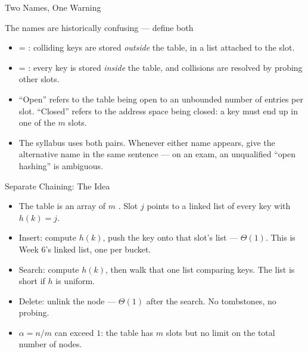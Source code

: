 \documentclass[aspectratio=169]{beamer}
\begin{document}
\begin{frame}{Two Names, One Warning}
  \begin{alertblock}{The names are historically confusing --- define both}
    \begin{itemize}
      \item {} = : colliding keys are
        stored \emph{outside} the table, in a list attached to the slot.
      \item {} = : every key is stored
        \emph{inside} the table, and collisions are resolved by probing other
        slots.
    \end{itemize}
  \end{alertblock}
  \begin{itemize}
    \item ``Open'' refers to the table being open to an unbounded number of
      entries per slot. ``Closed'' refers to the address space being closed:
      a key must end up in one of the $m$ slots.
    \item The syllabus uses both pairs. Whenever either name appears, give the
      alternative name in the same sentence --- on an exam, an unqualified
      ``open hashing'' is ambiguous.
  \end{itemize}
\end{frame}

\begin{frame}{Separate Chaining: The Idea}
  \begin{itemize}
    \item The table is an array of $m$ . Slot $j$ points to a
      linked list of every key with $h(k)=j$.
    \item Insert: compute $h(k)$, push the key onto that slot's list ---
      $\Theta(1)$. This is Week 6's linked list, one per bucket.
    \item Search: compute $h(k)$, then walk that one list comparing keys.
      The list is short if $h$ is uniform.
    \item Delete: unlink the node --- $\Theta(1)$ after the search. No
      tombstones, no probing.
    \item $\alpha = n/m$ can exceed $1$: the table has $m$ slots but no limit
      on the total number of nodes.
  \end{itemize}
\end{frame}
\end{document}
